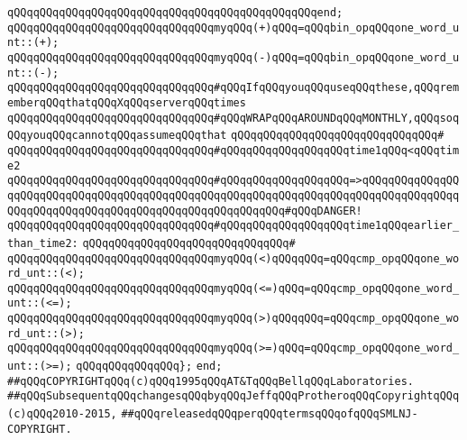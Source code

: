 \verb|qQQqqQQqqQQqqQQqqQQqqQQqqQQqqQQqqQQqqQQqqQQqqQQqend;|\newline
\newline
\verb|qQQqqQQqqQQqqQQqqQQqqQQqqQQqqQQqmyqQQq(+)qQQq=qQQqbin_opqQQqone_word_unt::(+);|\newline
\verb|qQQqqQQqqQQqqQQqqQQqqQQqqQQqqQQqmyqQQq(-)qQQq=qQQqbin_opqQQqone_word_unt::(-);|\newline
\newline
\verb|qQQqqQQqqQQqqQQqqQQqqQQqqQQqqQQq#qQQqIfqQQqyouqQQquseqQQqthese,qQQqrememberqQQqthatqQQqXqQQqserverqQQqtimes|\newline
\verb|qQQqqQQqqQQqqQQqqQQqqQQqqQQqqQQq#qQQqWRAPqQQqAROUNDqQQqMONTHLY,qQQqsoqQQqyouqQQqcannotqQQqassumeqQQqthat|\newline
\verb|qQQqqQQqqQQqqQQqqQQqqQQqqQQqqQQq#|\newline
\verb|qQQqqQQqqQQqqQQqqQQqqQQqqQQqqQQq#qQQqqQQqqQQqqQQqqQQqtime1qQQq<qQQqtime2|\newline
\verb|qQQqqQQqqQQqqQQqqQQqqQQqqQQqqQQq#qQQqqQQqqQQqqQQqqQQq=>qQQqqQQqqQQqqQQqqQQqqQQqqQQqqQQqqQQqqQQqqQQqqQQqqQQqqQQqqQQqqQQqqQQqqQQqqQQqqQQqqQQqqQQqqQQqqQQqqQQqqQQqqQQqqQQqqQQqqQQqqQQqqQQq#qQQqDANGER!|\newline
\verb|qQQqqQQqqQQqqQQqqQQqqQQqqQQqqQQq#qQQqqQQqqQQqqQQqqQQqtime1qQQqearlier_than_time2:|\newline
\verb|qQQqqQQqqQQqqQQqqQQqqQQqqQQqqQQq#|\newline
\verb|qQQqqQQqqQQqqQQqqQQqqQQqqQQqqQQqmyqQQq(<)qQQqqQQq=qQQqcmp_opqQQqone_word_unt::(<);|\newline
\verb|qQQqqQQqqQQqqQQqqQQqqQQqqQQqqQQqmyqQQq(<=)qQQq=qQQqcmp_opqQQqone_word_unt::(<=);|\newline
\verb|qQQqqQQqqQQqqQQqqQQqqQQqqQQqqQQqmyqQQq(>)qQQqqQQq=qQQqcmp_opqQQqone_word_unt::(>);|\newline
\verb|qQQqqQQqqQQqqQQqqQQqqQQqqQQqqQQqmyqQQq(>=)qQQq=qQQqcmp_opqQQqone_word_unt::(>=);|\newline
\verb|qQQqqQQqqQQqqQQq};|\newline
\verb|end;|\newline
\newline
\newline
\verb|##qQQqCOPYRIGHTqQQq(c)qQQq1995qQQqAT&TqQQqBellqQQqLaboratories.|\newline
\verb|##qQQqSubsequentqQQqchangesqQQqbyqQQqJeffqQQqProtheroqQQqCopyrightqQQq(c)qQQq2010-2015,|\newline
\verb|##qQQqreleasedqQQqperqQQqtermsqQQqofqQQqSMLNJ-COPYRIGHT.|\newline

